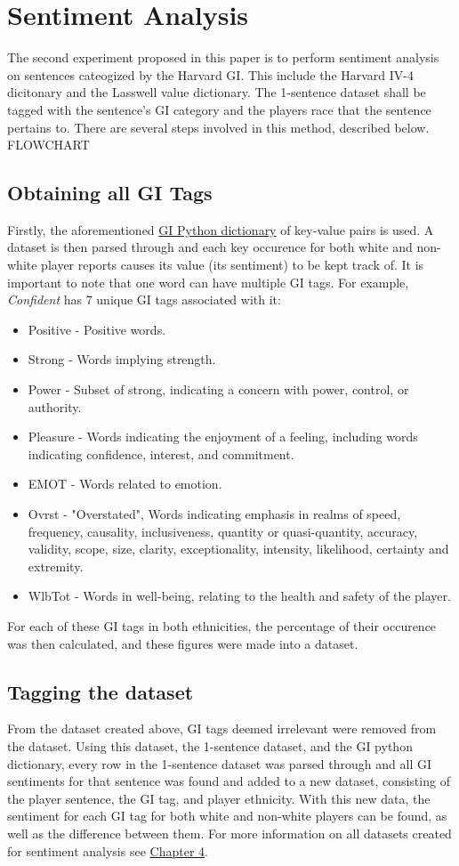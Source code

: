 \documentclass[oneside,12pt]{Classes/RoboticsLaTeX}
\begin{document}
\section{Sentiment Analysis}
The second experiment proposed in this paper is to perform sentiment analysis on sentences cateogized by the Harvard GI. This include the Harvard IV-4 dicitonary and the Lasswell value dictionary.
The 1-sentence dataset shall be tagged with the sentence's GI category and the players race that the sentence pertains to. There are several steps involved in this method, described below.
FLOWCHART
\subsection{Obtaining all GI Tags}
Firstly, the aforementioned \hyperref[sec:GI_dict]{GI Python dictionary} of key-value pairs is used. A dataset is then parsed through and each key occurence for both white and non-white player reports
causes its value (its sentiment) to be kept track of. It is important to note that one word can have multiple GI tags. For example, {\it Confident} has 7 unique GI tags associated with it:
\begin{itemize}
  \item Positive - Positive words.
  \item Strong - Words implying strength.
  \item Power - Subset of strong, indicating a concern with power, control, or authority.
  \item Pleasure - Words indicating the enjoyment of a feeling, including words indicating confidence, interest, and commitment.
  \item EMOT - Words related to emotion.
  \item Ovrst - "Overstated", Words indicating emphasis in realms of speed, frequency, causality, inclusiveness, quantity or 
                  quasi-quantity, accuracy, validity, scope, size, clarity, exceptionality, intensity, likelihood, certainty and extremity.
  \item WlbTot - Words in well-being, relating to the health and safety of the player.
\end{itemize}
For each of these GI tags in both ethnicities, the percentage of their occurence was then calculated, and these figures were made into a dataset.
\subsection{Tagging the dataset}
From the dataset created above, GI tags deemed irrelevant were removed from the dataset. Using this dataset, the 1-sentence dataset, and the GI python dictionary, every row in the 1-sentence dataset was parsed through and all GI 
sentiments for that sentence was found and added to a new dataset, consisting of the player sentence, the GI tag, and player ethnicity. With this new data, the sentiment for each GI tag for both white and non-white players can be found,
as well as the difference between them. For more information on all datasets created for sentiment analysis see \hyperref[sec:senti_data]{Chapter 4}.
\end{document}
